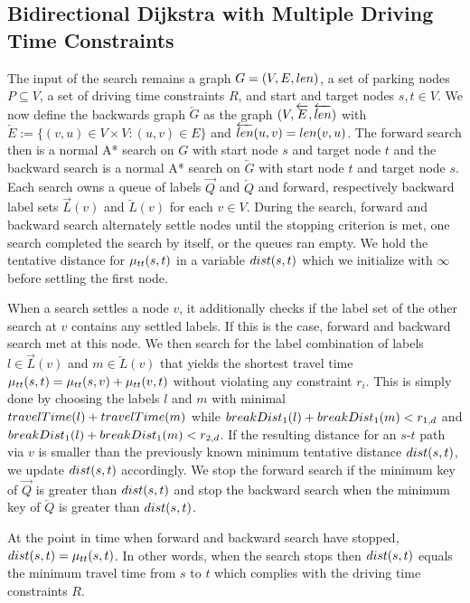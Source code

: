 \subsection{Bidirectional Dijkstra with Multiple Driving Time Constraints}
The input of the search remains a graph $G=(V,E,len)$, a set of parking nodes $P \subseteq V$, a set of driving time constraints $R$, and start and target nodes $s,t \in V$. We now define the backwards graph $\overleftarrow{G}$ as the graph $(V,\overleftarrow{E},\overleftarrow{len})$ with $\overleftarrow{E} := \{(v,u) \in V \times V : (u,v) \in E\}$ and $\overleftarrow{len}(u,v) = len(v,u)$. The forward search then is a normal A* search on $G$ with start node $s$ and target node $t$ and the backward search is a normal A* search on $\overleftarrow{G}$ with start node $t$ and target node $s$. Each search owns a queue of labels $\overrightarrow{Q}$ and $\overleftarrow{Q}$ and forward, respectively backward label sets $\overrightarrow{L}(v)$ and $\overleftarrow{L}(v)$ for each $v \in V$. During the search, forward and backward search alternately settle nodes until the stopping criterion is met, one search completed the search by itself, or the queues ran empty. We hold the tentative distance for $\mu_{tt}(s,t)$ in a variable $dist(s,t)$ which we initialize with $\infty$ before settling the first node.

When a search settles a node $v$, it additionally checks if the label set of the other search at $v$ contains any settled labels. If this is the case, forward and backward search met at this node. We then search for the label combination of labels $l \in \overrightarrow{L}(v)$ and $m \in \overleftarrow{L}(v)$ that yields the shortest travel time $\mu_{tt}(s,t) = \mu_{tt}(s,v) + \mu_{tt}(v,t)$ without violating any constraint $r_i$. This is simply done by choosing the labels $l$ and $m$ with minimal $travelTime(l) + travelTime(m)$ while $breakDist_1(l) + breakDist_1(m) < r_{1,d}$ and $breakDist_1(l) + breakDist_1(m) < r_{2,d}$. If the resulting distance for an $s$-$t$ path via $v$ is smaller than the previously known minimum tentative distance $dist(s,t)$, we update $dist(s,t)$ accordingly. We stop the forward search if the minimum key of $\overrightarrow{Q}$ is greater than $dist(s,t)$ and stop the backward search when the minimum key of $\overleftarrow{Q}$ is greater than $dist(s,t)$.

\begin{theorem}
	At the point in time when forward and backward search have stopped, $dist(s,t) = \mu_{tt}(s,t)$. In other words, when the search stops then $dist(s,t)$ equals the minimum travel time from $s$ to $t$ which complies with the driving time constraints $R$.
\end{theorem}

